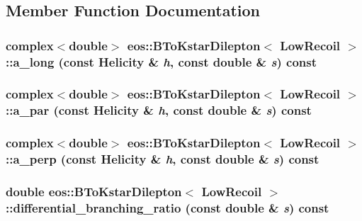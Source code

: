 \subsection{Member Function Documentation}
\hypertarget{classeos_1_1BToKstarDilepton_3_01LowRecoil_01_4_abd2799a92ea23c32a4c95b9331bb0937}{
\subsubsection[{a\_\-long}]{\setlength{\rightskip}{0pt plus 5cm}complex$<$double$>$ eos::BToKstarDilepton$<$ {\bf LowRecoil} $>$::a\_\-long (const {\bf Helicity} \& {\em h}, \/  const double \& {\em s}) const}}
\label{classeos_1_1BToKstarDilepton_3_01LowRecoil_01_4_abd2799a92ea23c32a4c95b9331bb0937}
\hypertarget{classeos_1_1BToKstarDilepton_3_01LowRecoil_01_4_a17fa27f2d53760333e9b128d650e7cc7}{
\subsubsection[{a\_\-par}]{\setlength{\rightskip}{0pt plus 5cm}complex$<$double$>$ eos::BToKstarDilepton$<$ {\bf LowRecoil} $>$::a\_\-par (const {\bf Helicity} \& {\em h}, \/  const double \& {\em s}) const}}
\label{classeos_1_1BToKstarDilepton_3_01LowRecoil_01_4_a17fa27f2d53760333e9b128d650e7cc7}
\hypertarget{classeos_1_1BToKstarDilepton_3_01LowRecoil_01_4_a8f13a8f5eb417374e49b46f9897a7582}{
\subsubsection[{a\_\-perp}]{\setlength{\rightskip}{0pt plus 5cm}complex$<$double$>$ eos::BToKstarDilepton$<$ {\bf LowRecoil} $>$::a\_\-perp (const {\bf Helicity} \& {\em h}, \/  const double \& {\em s}) const}}
\label{classeos_1_1BToKstarDilepton_3_01LowRecoil_01_4_a8f13a8f5eb417374e49b46f9897a7582}
\hypertarget{classeos_1_1BToKstarDilepton_3_01LowRecoil_01_4_a668814b8c9d2801119d7a9e9d5a6cef2}{
\subsubsection[{differential\_\-branching\_\-ratio}]{\setlength{\rightskip}{0pt plus 5cm}double eos::BToKstarDilepton$<$ {\bf LowRecoil} $>$::differential\_\-branching\_\-ratio (const double \& {\em s}) const}}
